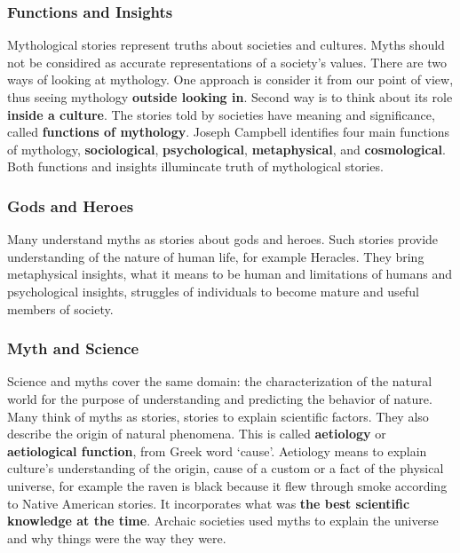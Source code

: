 \documentclass{article}
\begin{document}
\subsubsection{Functions and Insights}

Mythological stories represent truths about societies and cultures. Myths should not be considired as accurate representations of a society's values. There are two ways of looking at mythology. One approach is consider it from our point of view, thus seeing mythology \textbf{outside looking in}. Second way is to think about its role \textbf{inside a culture}. The stories told by societies have meaning and significance, called \textbf{functions of mythology}. Joseph Campbell identifies four main functions of mythology, \textbf{sociological}, \textbf{psychological}, \textbf{metaphysical}, and \textbf{cosmological}. Both functions and insights illumincate truth of mythological stories.

\subsubsection{Gods and Heroes}

Many understand myths as stories about gods and heroes. Such stories provide understanding of the nature of human life, for example Heracles. They bring metaphysical insights, what it means to be human and limitations of humans and psychological insights, struggles of individuals to become mature and useful members of society.

\subsubsection{Myth and Science}

Science and myths cover the same domain: the characterization of the natural world for the purpose of understanding and predicting the behavior of nature. Many think of myths as stories, stories to explain scientific factors. They also describe the origin of natural phenomena. This is called \textbf{aetiology} or \textbf{aetiological function}, from Greek word `cause'. Aetiology means to explain culture's understanding of the origin, cause of a custom or a fact of the physical universe, for example the raven is black because it flew through smoke according to Native American stories. It incorporates what was \textbf{the best scientific knowledge at the time}. Archaic societies used myths to explain the universe and why things were the way they were.
\end{document}
